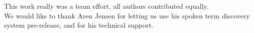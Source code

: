 \documentclass[final]{beamer}
\begin{document}
\begin{frame}[t]
\begin{multicols}{3}
This work really was a team effort, all authors contributed equally.\\
We would like to thank Aren Jensen for letting us use his spoken term discovery system pre-release, and for his technical support.


\end{multicols}

\end{frame}
\end{document}
